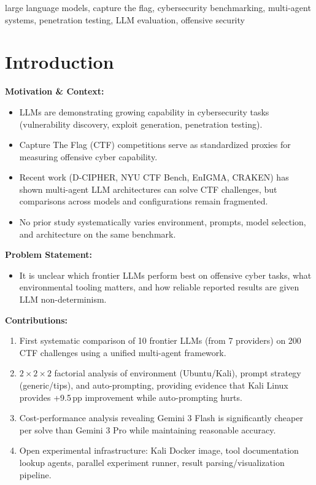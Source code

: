 \documentclass[conference]{IEEEtran}
\begin{document}
\begin{abstract}
ABSTRACT WILL BE WRITTEN AT THE END OF THE PAPER
\end{abstract}

\begin{IEEEkeywords}
large language models, capture the flag, cybersecurity benchmarking, multi-agent systems, penetration testing, LLM evaluation, offensive security
\end{IEEEkeywords}

\section{Introduction}

\noindent\textbf{Motivation \& Context:}
\begin{itemize}
  \item LLMs are demonstrating growing capability in cybersecurity tasks (vulnerability discovery, exploit generation, penetration testing).
  \item Capture The Flag (CTF) competitions serve as standardized proxies for measuring offensive cyber capability.
  \item Recent work (D-CIPHER, NYU CTF Bench, EnIGMA, CRAKEN) has shown multi-agent LLM architectures can solve CTF challenges, but comparisons across models and configurations remain fragmented.
  \item No prior study systematically varies environment, prompts, model selection, and architecture on the same benchmark.
\end{itemize}

\noindent\textbf{Problem Statement:}
\begin{itemize}
  \item It is unclear which frontier LLMs perform best on offensive cyber tasks, what environmental tooling matters, and how reliable reported results are given LLM non-determinism.
\end{itemize}

\noindent\textbf{Contributions:}
\begin{enumerate}
  \item First systematic comparison of 10 frontier LLMs (from 7 providers) on 200 CTF challenges using a unified multi-agent framework.
  \item $2\!\times\!2\!\times\!2$ factorial analysis of environment (Ubuntu/Kali), prompt strategy (generic/tips), and auto-prompting, providing evidence that Kali Linux provides +9.5\,pp improvement while auto-prompting hurts.
  \item Cost-performance analysis revealing Gemini 3 Flash is significantly cheaper per solve than Gemini 3 Pro while maintaining reasonable accuracy.
  \item Open experimental infrastructure: Kali Docker image, tool documentation lookup agents, parallel experiment runner, result parsing/visualization pipeline.
\end{enumerate}
\end{document}
